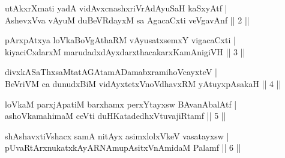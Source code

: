 \vskip 5pt
\begin{shl}
utAkxrXmati yadA vidAvxcnashxriVrAdAyuSaH kaSxyAtf | \\
AshevxVva vAyuM duBeVRdayxM sa AgacaCxti veVgavAnf \hfill ||  2 ||
\end{shl}
\vskip 5pt
\begin{shl}
pArxpAtxya loVkaBoVgAthaRM vAyusatxsemxY vigacaCxti | \\
kiyaciCxdarxM marudadxdAyxdarxthacakarxKamAnigiVH \hfill ||  3 || 
\end{shl}
\vskip 5pt
\begin{shl}
divxkASaThxsaMtatAGAtamADamabxramihoVcayxteV | \\
BeVriVM ca dunudxBiM vidAyxtetxVnoVdhavxRM yAtuyxpAsakaH \hfill ||  4 || 
\end{shl}
\vskip 5pt
\begin{shl}
loVkaM parxjApatiM barxhamx perxYtayxsw BAvanAbalAtf | \\
ashoVkamahimaM ceVti duHKatadedhxVtuvajiRtamf \hfill ||  5 || 
\end{shl}
\vskip 5pt
\begin{shl}
shAshavxtiVshacx samA nitAyx asimxlolxVkeV vasatayxsw  | \\
pUvaRtArxnukatxkAyARNAmupAsitxVnAmidaM Palamf \hfill ||  6 || 
\end{shl}
\vskip 5pt
